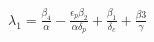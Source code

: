 \documentclass[preview]{standalone}
\begin{document}
\begin{center}
$\lambda_1 = \frac{\beta_4}{\alpha} - \frac{\epsilon_p \beta_2}{\alpha \delta_p} + \frac{\beta_1}{\delta_c} + \frac{\beta3}{\gamma}$
\end{center}
\end{document}
